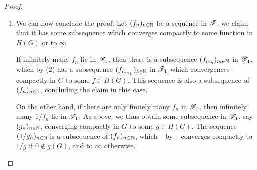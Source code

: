 \begin{proof}
\begin{enumerate}
        \item We can now conclude the proof. Let $(f_n)_{n \in \mathbb{N}}$ be a sequence in $\mathscr{F}$, we claim that it has some subsequence which converges compactly to some function in $H(G)$ or to $\infty$.
        
        If infinitely many $f_n$ lie in $\mathscr{F}_1$, then there is a subsequence $(f_{n_m})_{m \in \mathbb{N}}$ in $\mathscr{F}_1$, which by (2) has a subsequence $(f_{n_{m_k}})_{k \in \mathbb{N}}$ in $\mathscr{F}_1$ which convergences compactly in $G$ to some $f \in H(G)$. This sequence is also a subsequence of $(f_n)_{n \in \mathbb{N}}$, concluding the claim in this case.
        
        On the other hand, if there are only finitely many $f_n$ in $\mathscr{F}_1$, then infinitely many $1 / f_n$ lie in $\mathscr{F}_1$. As above, we thus obtain some subsequence in $\mathscr{F}_1$, say $(g_n)_{n \in \mathbb{N}}$, converging compactly in $G$ to some $g \in H(G)$. The sequence $(1 / g_n)_{n \in \mathbb{N}}$ is a subsequence of $(f_n)_{n \in \mathbb{N}}$, which -- by  -- converges compactly to $1 / g$ if $0 \notin g(G) $, and to $\infty$ otherwise.
    \end{enumerate}
\end{proof}